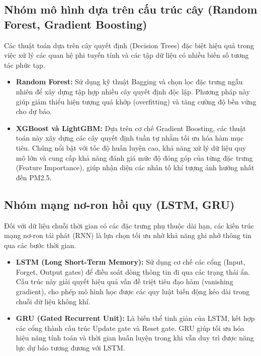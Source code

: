 \subsection{Nhóm mô hình dựa trên cấu trúc cây (Random Forest, Gradient Boosting)}
Các thuật toán dựa trên cây quyết định (Decision Trees) đặc biệt hiệu quả trong việc xử lý các quan hệ phi tuyến tính và các tập dữ liệu có nhiều biến số tương tác phức tạp.
\begin{itemize}
    \item \textbf{Random Forest:} Sử dụng kỹ thuật Bagging và chọn lọc đặc trưng ngẫu nhiên để xây dựng tập hợp nhiều cây quyết định độc lập. Phương pháp này giúp giảm thiểu hiện tượng quá khớp (overfitting) và tăng cường độ bền vững cho dự báo.
    \item \textbf{XGBoost và LightGBM:} Dựa trên cơ chế Gradient Boosting, các thuật toán này xây dựng các cây quyết định tuần tự nhằm tối ưu hóa hàm mục tiêu. Chúng nổi bật với tốc độ huấn luyện cao, khả năng xử lý dữ liệu quy mô lớn và cung cấp khả năng đánh giá mức độ đóng góp của từng đặc trưng (Feature Importance), giúp nhận diện các nhân tố khí tượng ảnh hưởng nhất đến PM2.5.
\end{itemize}
\subsection{Nhóm mạng nơ-ron hồi quy (LSTM, GRU)}
Đối với dữ liệu chuỗi thời gian có các đặc trưng phụ thuộc dài hạn, các kiến trúc mạng nơ-ron tái phát (RNN) là lựa chọn tối ưu nhờ khả năng ghi nhớ thông tin qua các bước thời gian.
\begin{itemize}
    \item \textbf{LSTM (Long Short-Term Memory):} Sử dụng cơ chế các cổng (Input, Forget, Output gates) để điều soát dòng thông tin đi qua các trạng thái ẩn. Cấu trúc này giải quyết hiệu quả vấn đề triệt tiêu đạo hàm (vanishing gradient), cho phép mô hình học được các quy luật biến động kéo dài trong chuỗi dữ liệu không khí.
    \item \textbf{GRU (Gated Recurrent Unit):} Là biến thể tinh giản của LSTM, kết hợp các cổng thành cấu trúc Update gate và Reset gate. GRU giúp tối ưu hóa hiệu năng tính toán và thời gian huấn luyện trong khi vẫn duy trì được năng lực dự báo tương đương với LSTM.
\end{itemize}
